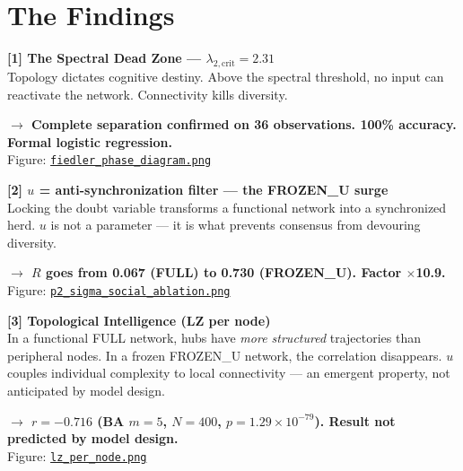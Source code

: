\documentclass[11pt, a4paper]{article}
\newcommand{\result}[1]{\textbf{\color{positive}#1}}
\begin{document}
\section{The Findings}

\begin{finding}
\textbf{[1] The Spectral Dead Zone --- $\lambda_{2,\mathrm{crit}} = 2.31$}\\
Topology dictates cognitive destiny. Above the spectral threshold, no input can reactivate the
network. Connectivity kills diversity.

\result{$\rightarrow$ Complete separation confirmed on 36 observations. 100\% accuracy. Formal logistic regression.}\\
Figure: \href{https://github.com/cafe-virtuel/Mem4ristor/blob/main/figures/fiedler_phase_diagram.png}{\texttt{fiedler\_phase\_diagram.png}}
\end{finding}

\vspace{0.5em}

\begin{finding}
\textbf{[2] $u$ = anti-synchronization filter --- the FROZEN\_U surge}\\
Locking the doubt variable transforms a functional network into a synchronized herd. $u$ is not a
parameter --- it is what prevents consensus from devouring diversity.

\result{$\rightarrow$ $R$ goes from 0.067 (FULL) to 0.730 (FROZEN\_U). Factor $\times$10.9.}\\
Figure: \href{https://github.com/cafe-virtuel/Mem4ristor/blob/main/figures/p2_sigma_social_ablation.png}{\texttt{p2\_sigma\_social\_ablation.png}}
\end{finding}

\vspace{0.5em}

\begin{finding}
\textbf{[3] Topological Intelligence (LZ per node)}\\
In a functional FULL network, hubs have \textit{more structured} trajectories than peripheral nodes.
In a frozen FROZEN\_U network, the correlation disappears. $u$ couples individual complexity to
local connectivity --- an emergent property, not anticipated by model design.

\result{$\rightarrow$ $r = -0.716$ (BA $m=5$, $N=400$, $p = 1.29 \times 10^{-79}$). Result not predicted by model design.}\\
Figure: \href{https://github.com/cafe-virtuel/Mem4ristor/blob/main/figures/lz_per_node.png}{\texttt{lz\_per\_node.png}}
\end{finding}
\end{document}
